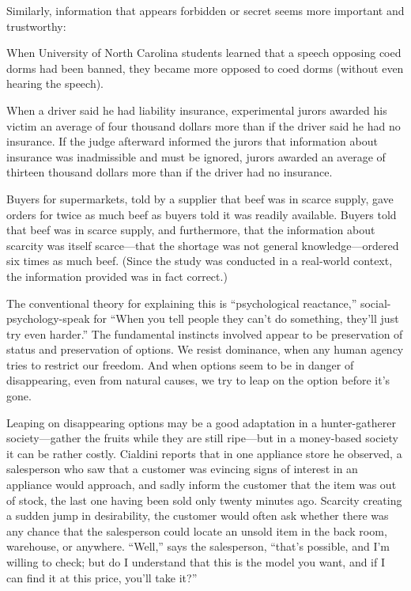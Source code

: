 {
 Similarly, information that appears forbidden or secret seems more
important and trustworthy:}

{
 When University of North Carolina students learned that a speech
opposing coed dorms had been banned, they became more opposed to coed
dorms (without even hearing the speech).}

{
 When a driver said he had liability insurance, experimental jurors
awarded his victim an average of four thousand dollars more than if the
driver said he had no insurance. If the judge afterward informed the
jurors that information about insurance was inadmissible and must be
ignored, jurors awarded an average of thirteen thousand dollars more
than if the driver had no insurance.}

{
 Buyers for supermarkets, told by a supplier that beef was in
scarce supply, gave orders for twice as much beef as buyers told it was
readily available. Buyers told that beef was in scarce supply, and
furthermore, that the information about scarcity was itself
scarce---that the shortage was not general knowledge---ordered six
times as much beef. (Since the study was conducted in a real-world
context, the information provided was in fact
correct.)}

{
 The conventional theory for explaining this is
``psychological reactance,''
social-psychology-speak for ``When you tell people
they can't do something, they'll just
try even harder.'' The fundamental instincts involved
appear to be preservation of status and preservation of options. We
resist dominance, when any human agency tries to restrict our freedom.
And when options seem to be in danger of disappearing, even from
natural causes, we try to leap on the option before
it's gone.}

{
 Leaping on disappearing options may be a good adaptation in a
hunter-gatherer society---gather the fruits while they are still
ripe---but in a money-based society it can be rather costly. Cialdini
reports that in one appliance store he observed, a salesperson who saw
that a customer was evincing signs of interest in an appliance would
approach, and sadly inform the customer that the item was out of stock,
the last one having been sold only twenty minutes ago. Scarcity
creating a sudden jump in desirability, the customer would often ask
whether there was any chance that the salesperson could locate an
unsold item in the back room, warehouse, or anywhere.
``Well,'' says the salesperson,
``that's possible, and
I'm willing to check; but do I understand that this is
the model you want, and if I can find it at this price,
you'll take it?''}

